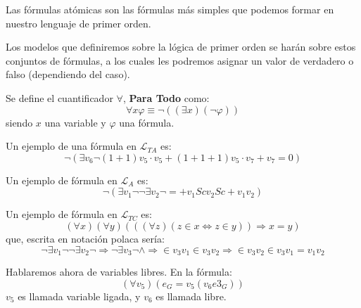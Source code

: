 \documentclass[12pt]{report}
\newcounter{it}
\theoremstyle{largebreak}
\begin{document}
    \begin{obs}
        Las fórmulas atómicas son las fórmulas más simples que podemos formar en nuestro lenguaje de primer orden.
    \end{obs}

    Los modelos que definiremos sobre la lógica de primer orden se harán sobre estos conjuntos de fórmulas, a los cuales les podremos asignar un valor de verdadero o falso (dependiendo del caso).

    \begin{mydef}
        Se define el cuantificador $\forall$, \textbf{Para Todo} como:
        \begin{equation*}
            \forall x\varphi \equiv \neg((\exists x)(\neg\varphi))
        \end{equation*}
        siendo $x$ una variable y $\varphi$ una fórmula.
    \end{mydef}

    \begin{exa}
        Un ejemplo de una fórmula en $\mathcal{L}_{TA}$ es:
        \begin{equation*}
            \neg(\exists v_6\neg (1+1)v_5\cdot v_5+(1+1+1)v_5\cdot v_7+v_7=0)
        \end{equation*}
    \end{exa}

    \begin{exa}
        Un ejemplo de fórmula en $\mathcal{L}_A$ es:
        \begin{equation*}
            \neg(\exists v_1\neg\neg \exists v_2\neg=+v_1Scv_2Sc+v_1v_2)
        \end{equation*}
    \end{exa}

    \begin{exa}
        Un ejemplo de fórmula en $\mathcal{L}_{TC}$ es:
        \begin{equation*}
            (\forall x)(\forall y)(((\forall z)( z\in x\iff z\in y))\Rightarrow x=y)
        \end{equation*}
        que, escrita en notación polaca sería:
        \begin{equation*}
            \neg\exists v_1\neg\neg\exists v_2\neg \Rightarrow\neg \exists v_3\neg\land\Rightarrow \in v_3v_1\in v_3v_2\Rightarrow \in v_3v_2\in v_3v_1=v_1v_2
        \end{equation*}
    \end{exa}

    Hablaremos ahora de variables libres. En la fórmula:
    \begin{equation*}
        (\forall v_5)(e_G=v_5(v_6e3_G))
    \end{equation*}
    $v_5$ es llamada variable ligada, y $v_6$ es llamada libre.
    
\end{document}
